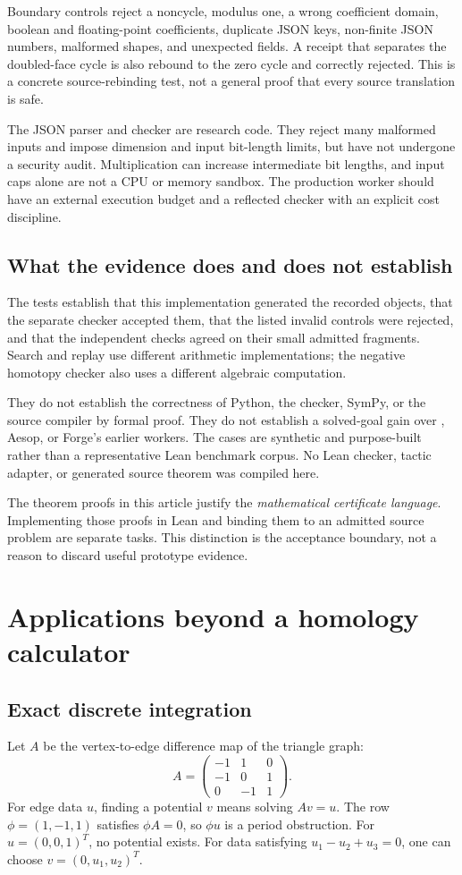\documentclass[11pt,letterpaper]{article}
\theoremstyle{definition}\newtheorem{definition}[theorem]{Definition}
\theoremstyle{remark}\newtheorem{remark}[theorem]{Remark}
\newcommand{\code}[1]{\texttt{\detokenize{#1}}}
\begin{document}
Boundary controls reject a noncycle, modulus one, a wrong coefficient domain,
boolean and floating-point coefficients, duplicate JSON keys, non-finite JSON
numbers, malformed shapes, and unexpected fields. A receipt that separates the
doubled-face cycle is also rebound to the zero cycle and correctly rejected.
This is a concrete source-rebinding test, not a general proof that every source
translation is safe.

The JSON parser and checker are research code. They reject many malformed
inputs and impose dimension and input bit-length limits, but have not undergone
a security audit. Multiplication can increase intermediate bit lengths, and
input caps alone are not a CPU or memory sandbox. The production worker should
have an external execution budget and a reflected checker with an explicit
cost discipline.

\subsection{What the evidence does and does not establish}
The tests establish that this implementation generated the recorded objects,
that the separate checker accepted them, that the listed invalid controls were
rejected, and that the independent checks agreed on their small admitted
fragments. Search and replay use different arithmetic implementations; the
negative homotopy checker also uses a different algebraic computation.

They do not establish the correctness of Python, the checker, SymPy, or the
source compiler by formal proof. They do not establish a solved-goal gain over
\code{grind}, Aesop, or Forge's earlier workers. The cases are synthetic and
purpose-built rather than a representative Lean benchmark corpus. No Lean
checker, tactic adapter, or generated source theorem was compiled here.

The theorem proofs in this article justify the \emph{mathematical certificate
language}. Implementing those proofs in Lean and binding them to an admitted
source problem are separate tasks. This distinction is the acceptance boundary,
not a reason to discard useful prototype evidence.

\section{Applications beyond a homology calculator}
\label{sec:applications}

\subsection{Exact discrete integration}
Let $A$ be the vertex-to-edge difference map of the triangle graph:
\[
 A=\begin{pmatrix}-1&1&0\\-1&0&1\\0&-1&1\end{pmatrix}.
\]
For edge data $u$, finding a potential $v$ means solving $Av=u$.
The row $\phi=(1,-1,1)$ satisfies $\phi A=0$, so $\phi u$ is a period
obstruction. For $u=(0,0,1)^T$, no potential exists. For data satisfying
$u_1-u_2+u_3=0$, one can choose $v=(0,u_1,u_2)^T$.
\end{document}

